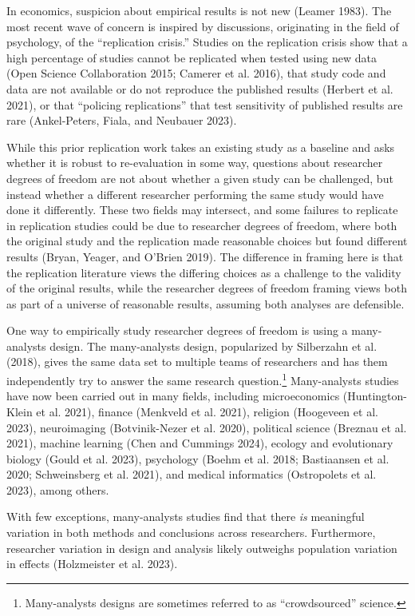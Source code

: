 \documentclass[
  letterpaper,
  DIV=11,
  numbers=noendperiod]{scrartcl}
\begin{document}
In economics, suspicion about empirical results is not new (Leamer
1983). The most recent wave of concern is inspired by discussions,
originating in the field of psychology, of the ``replication crisis.''
Studies on the replication crisis show that a high percentage of studies
cannot be replicated when tested using new data (Open Science
Collaboration 2015; Camerer et al. 2016), that study code and data are
not available or do not reproduce the published results (Herbert et al.
2021), or that ``policing replications'' that test sensitivity of
published results are rare (Ankel-Peters, Fiala, and Neubauer 2023).

While this prior replication work takes an existing study as a baseline
and asks whether it is robust to re-evaluation in some way, questions
about researcher degrees of freedom are not about whether a given study
can be challenged, but instead whether a different researcher performing
the same study would have done it differently. These two fields may
intersect, and some failures to replicate in replication studies could
be due to researcher degrees of freedom, where both the original study
and the replication made reasonable choices but found different results
(Bryan, Yeager, and O'Brien 2019). The difference in framing here is
that the replication literature views the differing choices as a
challenge to the validity of the original results, while the researcher
degrees of freedom framing views both as part of a universe of
reasonable results, assuming both analyses are defensible.

One way to empirically study researcher degrees of freedom is using a
many-analysts design. The many-analysts design, popularized by
Silberzahn et al. (2018), gives the same data set to multiple teams of
researchers and has them independently try to answer the same research
question.\footnote{Many-analysts designs are sometimes referred to as
  ``crowdsourced'' science.} Many-analysts studies have now been carried
out in many fields, including microeconomics (Huntington-Klein et al.
2021), finance (Menkveld et al. 2021), religion (Hoogeveen et al. 2023),
neuroimaging (Botvinik-Nezer et al. 2020), political science (Breznau et
al. 2021), machine learning (Chen and Cummings 2024), ecology and
evolutionary biology (Gould et al. 2023), psychology (Boehm et al. 2018;
Bastiaansen et al. 2020; Schweinsberg et al. 2021), and medical
informatics (Ostropolets et al. 2023), among others.

With few exceptions, many-analysts studies find that there \emph{is}
meaningful variation in both methods and conclusions across researchers.
Furthermore, researcher variation in design and analysis likely
outweighs population variation in effects (Holzmeister et al. 2023).
\end{document}
